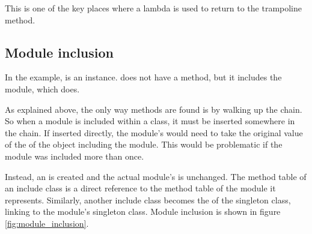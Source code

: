 This is one of the key places where a lambda is used to return to the trampoline method.

\subsection{Module inclusion}
\label{sec:module_inclusion}

In the example,  is an  instance.  does not have a  method, but it includes the  module, which does.

As explained above, the only way methods are found is by walking up the  chain. So when a module is included within a class, it must be inserted somewhere in the  chain. If inserted directly, the module's  would need to take the original value of the  of the object including the module. This would be problematic if the module was included more than once.

Instead, an  is created and the actual module's  is unchanged. The method table of an include class is a direct reference to the method table of the module it represents. Similarly, another include class becomes the  of the singleton class, linking to the module's singleton class. Module inclusion is shown in figure \ref{fig:module_inclusion}.

